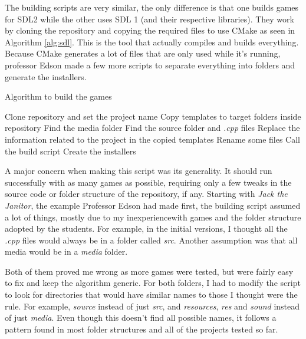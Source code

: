 The building scripts are very similar, the only difference is that one builds games for SDL2 while the other uses SDL 1 (and their respective libraries). They work by cloning the repository and copying the required files to use CMake as seen in Algorithm \ref{alg:sdl}. This is the tool that actually compiles and builds everything. Because CMake generates a lot of files that are only used while it's running, professor Edson made a few more scripts to separate everything into folders and generate the installers.

\begin{algorithm}[h!]
\caption{Algorithm to build the games}
\label{alg:sdl}
\begin{algorithmic}
\Start
\State Clone repository and set the project name
\State Copy templates to target folders inside repository
\State Find the media folder
\State Find the source folder and \textit{.cpp} files
\State Replace the information related to the project in the copied templates
\State Rename some files
\State Call the build script
\State Create the installers
\End
\end{algorithmic}
\end{algorithm}

A major concern when making this script was its generality. It should run successfully with as many games as possible, requiring only a few tweaks in the source code or folder structure of the repository, if any. Starting with \textit{Jack the Janitor}, the example Professor Edson had made first, the  building script assumed a lot of things, mostly due to my inexperiencewith games and the folder structure adopted by the students. For example, in the initial versions, I thought all the \textit{.cpp} files would always be in a folder called \textit{src}. Another assumption was that all media would be in a \textit{media} folder.

Both of them proved me wrong as more games were tested, but were fairly easy to fix and keep the algorithm generic. For both folders, I had to modify the script to look for directories that would have similar names to those I thought were the rule. For example, \textit{source} instead of just \textit{src}, and \textit{resources}, \textit{res} and \textit{sound} instead of just \textit{media}. Even though this doesn't find all possible names, it follows a pattern found in most folder structures and all of the projects tested so far.

